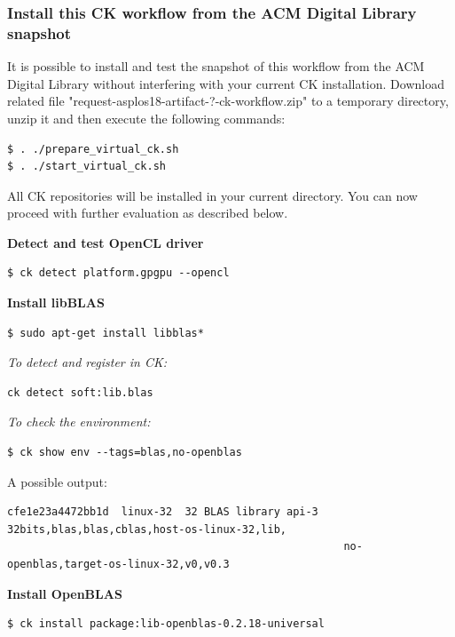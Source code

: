 \documentclass[sigplan]{acmart}
\begin{document}
\subsubsection{Install this CK workflow from the ACM Digital Library snapshot}

It is possible to install and test the snapshot of this workflow 
from the ACM Digital Library without interfering with your current CK installation.
Download related file "request-asplos18-artifact-?-ck-workflow.zip"
to a temporary directory, unzip it and then execute the following commands:

\begin{verbatim}
$ . ./prepare_virtual_ck.sh
$ . ./start_virtual_ck.sh
\end{verbatim}

All CK repositories will be installed in your current directory.
You can now proceed with further evaluation as described below.

\textbf{Detect and test OpenCL driver}

\begin{verbatim}
$ ck detect platform.gpgpu --opencl 
\end{verbatim}


\textbf{Install libBLAS}

\begin{verbatim}
$ sudo apt-get install libblas*
\end{verbatim}

\textit{To detect and register in CK:}

\begin{verbatim}
ck detect soft:lib.blas
\end{verbatim}

\textit{To check the environment:}

\begin{verbatim}
$ ck show env --tags=blas,no-openblas
\end{verbatim}

A possible output:

\begin{verbatim}
cfe1e23a4472bb1d  linux-32  32 BLAS library api-3  32bits,blas,blas,cblas,host-os-linux-32,lib,
                                                     no-openblas,target-os-linux-32,v0,v0.3
\end{verbatim}

\textbf{Install OpenBLAS}

\begin{verbatim}
$ ck install package:lib-openblas-0.2.18-universal
\end{verbatim}
\end{document}
